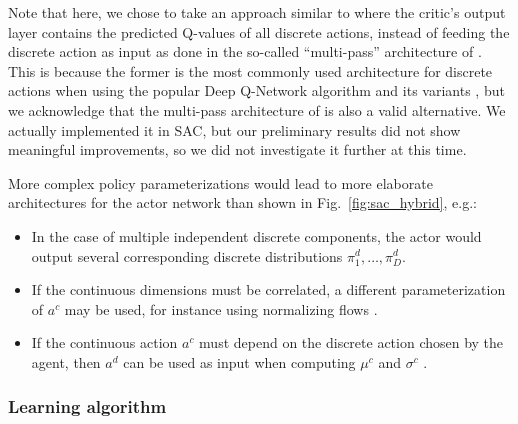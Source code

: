\documentclass[letterpaper]{article} \usepackage{aaai20}  \usepackage{times}  \usepackage{helvet} \usepackage{courier}  \usepackage[hyphens]{url}  \usepackage{graphicx} \urlstyle{rm} \def\UrlFont{\rm}  \usepackage{graphicx}  \usepackage[section]{placeins}
\newcommand{\citet}{\cite}  \newcommand{\citep}{\cite} \DeclareMathOperator*{\softmax}{softmax}
\begin{document}
Note that here, we chose to take an approach similar to \citet{xiong2018} where the critic's output layer contains the predicted Q-values of all discrete actions, instead of feeding the discrete action as input as done in the so-called ``multi-pass'' architecture of \citet{bester2019}.
This is because the former is the most commonly used architecture for discrete actions when using the popular Deep Q-Network algorithm and its variants \citep{mnih2015human,hessel2017}, but we acknowledge that the multi-pass architecture of \citet{bester2019} is also a valid alternative.
We actually implemented it in SAC, but our preliminary results did not show meaningful improvements, so we did not investigate it further at this time.

More complex policy parameterizations would lead to more elaborate architectures for the actor network than shown in Fig.~\ref{fig:sac_hybrid}, e.g.:
\begin{itemize}
\item In the case of multiple independent discrete components, the actor would output several corresponding discrete distributions $\pi^d_1, \ldots, \pi^d_D$.
\item If the continuous dimensions must be correlated, a different parameterization of $a^c$ may be used, for instance using normalizing flows \citep{mazoure2019leveraging}.
\item If the continuous action $a^c$ must depend on the discrete action chosen by the agent, then $a^d$ can be used as input when computing $\mu^c$ and $\sigma^c$ \citep{wei2018}.
\end{itemize}

\subsubsection{Learning algorithm}
\end{document}
